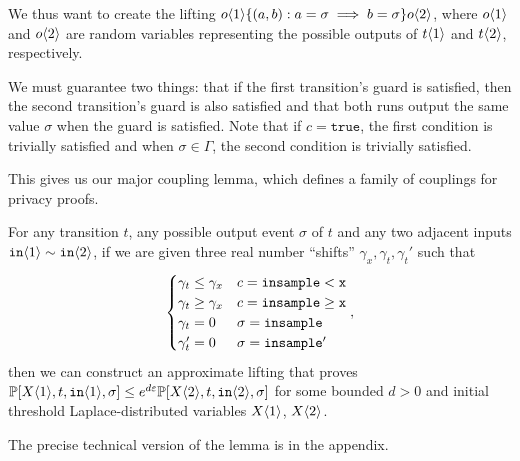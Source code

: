 We thus want to create the lifting $o\brangle{1}\{(a, b): a=\sigma\implies b=\sigma\}o\brangle{2}$, where $o\brangle{1}$ and $o\brangle{2}$ are random variables representing the possible outputs of $t\brangle{1}$ and $t\brangle{2}$, respectively.

We must guarantee two things: that if the first transition's guard is satisfied, then the second transition's guard is also satisfied and that both runs output the same value $\sigma$ when the guard is satisfied. Note that if $c = \texttt{true}$, the first condition is trivially satisfied and when $\sigma\in \Gamma$, the second condition is trivially satisfied. 

This gives us our major coupling lemma, which defines a family of couplings for privacy proofs.


\begin{lemma}\label{simplifiedIndTransitionCoupling}
  For any transition $t$, any possible output event $\sigma$ of $t$ and any two adjacent inputs $\texttt{in}\brangle{1}\sim \texttt{in}\brangle{2}$, if we are given three real number ``shifts'' $\gamma_x, \gamma_t, \gamma_t'$ such that \[
    \begin{cases}
      \gamma_t\leq\gamma_x & c = \lguard[\texttt{x}]\\
      \gamma_t\geq\gamma_x & c = \gguard[\texttt{x}]\\
      \gamma_t=0 & \sigma = \texttt{insample}\\
      \gamma_t'=0 & \sigma = \texttt{insample}'
    \end{cases},
  \]
  then we can construct an approximate lifting that proves $\PP[X\brangle{1}, t, \texttt{in}\brangle{1}, \sigma]\leq e^{d\varepsilon}\PP[X\brangle{2}, t, \texttt{in}\brangle{2}, \sigma]$ for some bounded $d>0$ and initial threshold Laplace-distributed variables $X\brangle{1}$, $X\brangle{2}$.
\end{lemma}

The precise technical version of the lemma is in the appendix. 

